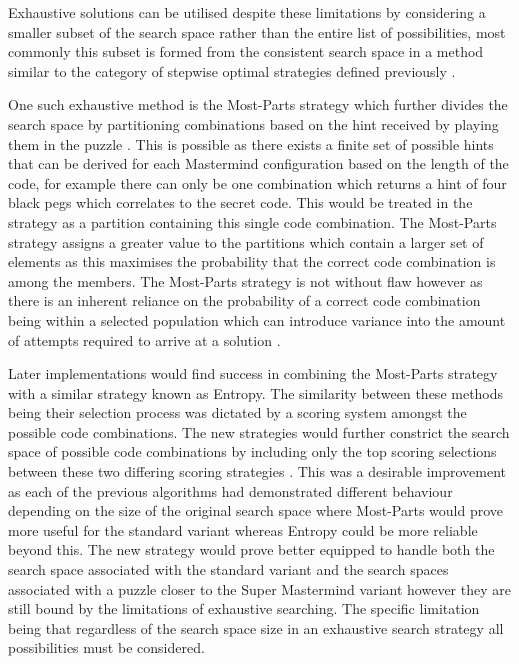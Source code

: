 \documentclass[11pt]{article}  %
\theoremstyle{definition}
\theoremstyle{remark}
\begin{document}
Exhaustive solutions can be utilised despite these limitations by considering a smaller subset of the search space rather than the entire list of possibilities, most commonly this subset is formed from the consistent search space in a method similar to the category of stepwise optimal strategies defined previously \cite {ExhaustiveMM,Yet}.

One such exhaustive method is the Most-Parts strategy which further divides the search space by partitioning combinations based on the hint received by playing them in the puzzle \cite{Yet}. This is possible as there exists a finite set of possible hints that can be derived for each Mastermind configuration based on the length of the code, for example there can only be one combination which returns a hint of four black pegs which correlates to the secret code. This would be treated in the strategy as a partition containing this single code combination. The Most-Parts strategy assigns a greater value to the partitions which contain a larger set of elements as this maximises the probability that the correct code combination is among the members. The Most-Parts strategy is not without flaw however as there is an inherent reliance on the probability of a correct code combination being within a selected population which can introduce variance into the amount of attempts required to arrive at a solution \cite {Yet}.

Later implementations would find success in combining the Most-Parts strategy with a similar strategy known as Entropy. The similarity between these methods being their selection process was dictated by a scoring system amongst the possible code combinations. The new strategies would further constrict the search space of possible code combinations by including only the top scoring selections between these two differing scoring strategies \cite{ExhaustiveMM}. This was a desirable improvement as each of the previous algorithms had demonstrated different behaviour depending on the size of the original search space where Most-Parts would prove more useful for the standard variant whereas Entropy could be more reliable beyond this. The new strategy would prove better equipped to handle both the search space associated with the standard variant and the search spaces associated with a puzzle closer to the Super Mastermind \cite{SuperMM} variant however they are still bound by the limitations of exhaustive searching. The specific limitation being that regardless of the search space size in an exhaustive search strategy all possibilities must be considered.
\end{document}
